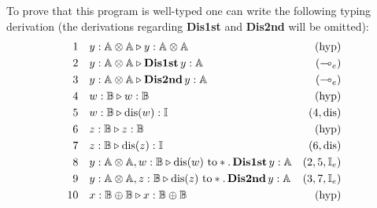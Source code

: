\begin{example}
To prove that this program is well-typed one can write the following typing derivation (the derivations regarding \textbf{Dis1st} and \textbf{Dis2nd} will be omitted):
\begin{equation*}
\begin{split}
1  \hspace{10 pt} & y : \mathbb{A} \otimes \mathbb{A}  \triangleright y : \mathbb{A}  \otimes \mathbb{A} \hspace{10 pt} & {(\text{hyp})} \\
2  \hspace{10 pt} & y : \mathbb{A}  \otimes \mathbb{A} \triangleright \textbf{Dis1st}   \, y : \mathbb{A} & {(\multimap_e)} \\
3  \hspace{10 pt} & y : \mathbb{A}  \otimes \mathbb{A}  \triangleright \textbf{Dis2nd}  \, y : \mathbb{A}  & {(\multimap_e)} \\
4  \hspace{10 pt} & w : \mathbb{B} \triangleright w : \mathbb{B}  \hspace{10 pt} & {(\text{hyp})} \\
5 \hspace{10 pt} & w : \mathbb{B} \triangleright \text{dis}(w): \mathbb{I} \hspace{10 pt} & {(4,\text{dis})} \\
6  \hspace{10 pt} & z : \mathbb{B} \triangleright z : \mathbb{B}  \hspace{10 pt} & {(\text{hyp})} \\
7 \hspace{10 pt} & z : \mathbb{B} \triangleright \text{dis}(z): \mathbb{I} \hspace{10 pt} & {(6,\text{dis})} \\
8 \hspace{10 pt} &  y : \mathbb{A}  \otimes \mathbb{A},  w : \mathbb{B}   \triangleright \text{dis}(w) \text{ to} * . \, \textbf{Dis1st} \, y : \typeA  & {(2,5,\mathbb{I}_{e})} \\
9 \hspace{10 pt} &   y : \mathbb{A}  \otimes \mathbb{A}, z : \mathbb{B}   \triangleright \text{dis}(z) \text{ to} * . \, \textbf{Dis2nd} \, y : \typeA & {(3,7,\mathbb{I}_{e})} \\
10 \hspace{10 pt} & x : \mathbb{B \oplus B} \triangleright x : \mathbb{B \oplus B}  \hspace{10 pt} & {(\text{hyp})} \\

\end{split}
\end{equation*}
\end{example}
